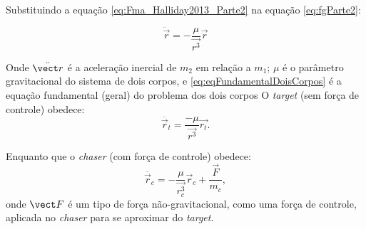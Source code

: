 Substituindo a equação \eqref{eq:Fma_Halliday2013_Parte2} na equação \eqref{eq:fgParte2}:

\begin{equation}
\label{eq:eqFundamentalDoisCorpos}
\ddot {\vec r} = -\frac{\mu}{\vec {r^3}}\vec r
\end{equation}

Onde $\ddot{\vect r}$ é a aceleração inercial de $m_2$ em relação a $m_1$; $\mu$ é o parâmetro gravitacional do sistema de dois corpos, e \eqref{eq:eqFundamentalDoisCorpos} é a equação fundamental (geral) do problema dos dois corpos \cite{fehse2003,wie2008space}
O \emph{target} (sem força de controle) obedece:
\begin{equation}
\label{eq:movimentoTarget}
\ddot{\vec r_t} = \frac{-\mu}{\vec {r^3}}\vec {r_t}.
\end{equation}

Enquanto que o \emph{chaser} (com força de controle) obedece:
\begin{equation}
\label{eq:movimentoChaser}
\ddot{\vec r_c}
=
-\frac{\mu}{\vec {r_c^3}}\vec r_c
+
\frac{\vec F}{m_c},
\end{equation}
onde $\vect F$ é um tipo de força não-gravitacional, como uma força de controle, aplicada no \emph{chaser} para se aproximar do \emph{target}.